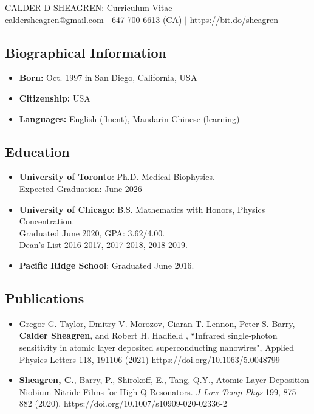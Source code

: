 \documentclass[12pt]{article}
\date{}
\begin{document}
\begin{center}
 \Large \sf CALDER D SHEAGREN: Curriculum Vitae\\
 { \normalsize \sf caldersheagren@gmail.com $|$ 647-700-6613 (CA) $|$ \href{https//bit.do/sheagren}{https://bit.do/sheagren}}
\end{center}

\subsection*{\sf Biographical Information}
\begin{itemize}
\item[] \textbf{Born:} Oct. 1997 in San Diego, California, USA
\item[] \textbf{Citizenship:} USA
\item[] \textbf{Languages:} English (fluent), Mandarin Chinese (learning)
\end{itemize}

\subsection*{\sf Education}

\begin{itemize}
\item[] {\bf University of Toronto}: Ph.D. Medical Biophysics. \\ 
Expected Graduation: June 2026

\item[] {\bf University of Chicago}: B.S. Mathematics with Honors,  Physics Concentration. \\ Graduated June 2020, GPA: 3.62/4.00.\\  Dean's List 2016-2017, 2017-2018, 2018-2019.

\item[]\textbf{Pacific Ridge School}: Graduated June 2016.
\end{itemize}

\subsection*{\sf Publications}
\begin{itemize}
	\item[] Gregor G. Taylor, Dmitry V. Morozov, Ciaran T. Lennon, Peter S. Barry, \textbf{Calder Sheagren}, and Robert H. Hadfield , ``Infrared single-photon sensitivity in atomic layer deposited superconducting nanowires", Applied Physics Letters 118, 191106 (2021) https://doi.org/10.1063/5.0048799

\item[] \textbf{Sheagren, C.}, Barry, P., Shirokoff, E., Tang, Q.Y., Atomic Layer Deposition Niobium Nitride Films for High-Q Resonators. \textit{J Low Temp Phys} 199, 875–882 (2020). https://doi.org/10.1007/s10909-020-02336-2

\end{itemize}
\end{document}
